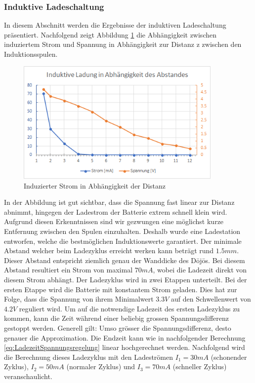 \subsubsection*{Induktive Ladeschaltung}\label{sec:batterie}
In diesem Abschnitt werden die Ergebnisse der induktiven Ladeschaltung präsentiert. Nachfolgend zeigt Abbildung \ref{fig:InduzierterStrom} die Abhängigkeit zwischen induziertem Strom und Spannung in Abhängigkeit zur Distanz z zwischen den Induktionsspulen.

\begin{figure}[H]
	\begin{center}
		\includegraphics[width=100mm]{data/InduktiveLadung.png}
		\caption[Induzierter Strom in Abhängigkeit der Distanz]{Induzierter Strom in Abhängigkeit der Distanz} %
		\label{fig:InduzierterStrom}
	\end{center}
\end{figure}

In der Abbildung ist gut sichtbar, dass die Spannung fast linear zur Distanz abnimmt, hingegen der Ladestrom der Batterie extrem schnell klein wird. Aufgrund diesen Erkenntnissen sind wir gezwungen eine möglichst kurze Entfernung zwischen den Spulen einzuhalten. Deshalb wurde eine Ladestation entworfen, welche die bestmöglichen Induktionswerte garantiert. Der minimale Abstand welcher beim Ladezyklus erreicht werken kann beträgt rund $1.5mm$. Dieser Abstand entspricht ziemlich genau der Wanddicke des Dōjōs. Bei diesem Abstand resultiert ein Strom von maximal $70mA$, wobei die Ladezeit direkt von diesem Strom abhängt. Der Ladezyklus wird in zwei Etappen unterteilt. Bei der ersten Etappe wird die Batterie mit konstantem Strom geladen. Dies hat zur Folge, dass die Spannung von ihrem Minimalwert $3.3V$ auf den Schwellenwert von $4.2V$ reguliert wird. Um auf die notwendige Ladezeit des ersten Ladezyklus zu kommen, kann die Zeit während einer beliebig grossen Spannungsdifferenz gestoppt werden. Generell gilt: Umso grösser die Spannungsdifferenz, desto genauer die Approximation. Die Endzeit kann wie in nachfolgender Berechnung \ref{eq:LadezeitSpannungsregelung} linear hochgerechnet werden. Nachfolgend wird die Berechnung dieses Ladezyklus mit den Ladeströmen $I_{1}=30mA$ (schonender Zyklus), $I_{2}=50mA$ (normaler Zyklus) und $I_{3}=70mA$ (schneller Zyklus) veranschaulicht. 

